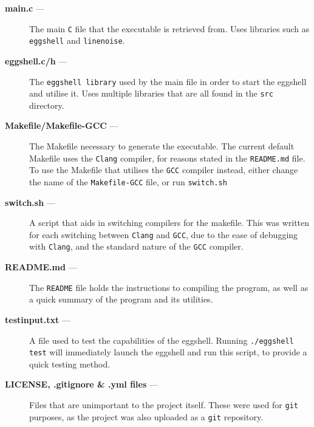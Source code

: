 \documentclass[12pt, a4paper]{report}
\begin{document}
            \begin{description}
                \item[\textbf{main.c} --- ]
                    The main \texttt{C} file that the executable is retrieved
                    from. Uses libraries such as \texttt{eggshell} and 
                    \texttt{linenoise}.
                \item[\textbf{eggshell.c/h} ---]
                    The \texttt{eggshell library} used by the main file in order
                    to start the eggshell and utilise it. Uses multiple libraries
                    that are all found in the \texttt{src} directory.
                \item[\textbf{Makefile/Makefile-GCC} ---]
                    The Makefile necessary to generate the executable. The current
                    default Makefile uses the \texttt{Clang} compiler, for reasons
                    stated in the \texttt{README.md} file. To use the Makefile that
                    utilises the \texttt{GCC} compiler instead, either change the
                    name of the \texttt{Makefile-GCC} file, or run \texttt{switch.sh}
                \item[\textbf{switch.sh} ---]
                    A script that aids in switching compilers for the makefile.
                    This was written for each switching between \texttt{Clang} and
                    \texttt{GCC}, due to the ease of debugging with \texttt{Clang},
                    and the standard nature of the \texttt{GCC} compiler.
                \item[\textbf{README.md} ---]
                    The \texttt{README} file holds the instructions to compiling the
                    program, as well as a quick summary of the program and its utilities.
                \item[\textbf{testinput.txt} ---]
                    A file used to test the capabilities of the eggshell. 
                    Running \texttt{./eggshell test} will immediately launch
                    the eggshell and run this script, to provide a quick 
                    testing method.
                \item[\textbf{LICENSE, .gitignore \& .yml files} ---]
                    Files that are unimportant to the project itself.
                    These were used for \texttt{git} purposes, as the project 
                    was also uploaded as a \texttt{git} repository.
            \end{description}
\end{document}
